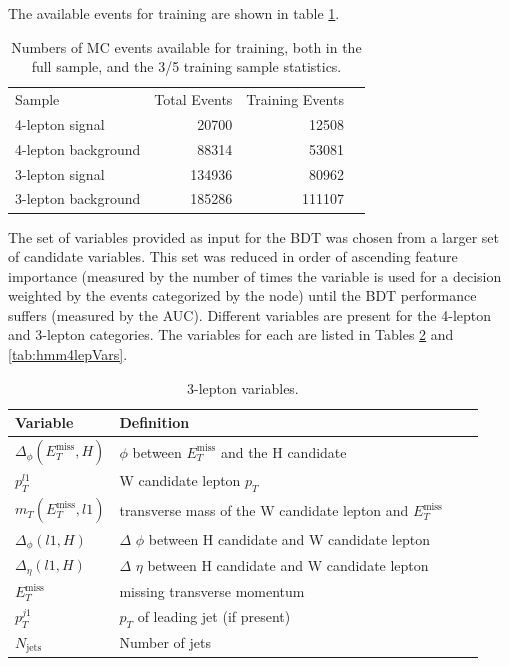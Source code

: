 The available events for training are shown in table \ref{tab:hmmSampleStatistics}.

\begin{table}[htbp]
 \begin{center}
\begin{tabular}{l r r r}\toprule
Sample               & Total Events & Training Events \\
4-lepton signal      & 20700        & 12508    \\
4-lepton background  & 88314        & 53081    \\
3-lepton signal      & 134936       & 80962    \\
3-lepton background  & 185286       & 111107   \\
\bottomrule\end{tabular} 
 \end{center}
 \caption{Numbers of MC events available for training, both in the full sample, and the 3/5 training sample statistics.}
\label{tab:hmmSampleStatistics}
\end{table}

The set of variables provided as input for the BDT was chosen from a larger set of candidate variables.
This set was reduced in order of ascending feature importance (measured by the number of times the variable is used for a decision weighted by the events categorized by the node) until the BDT performance suffers (measured by the AUC).
Different variables are present for the 4-lepton and 3-lepton categories.
The variables for each are listed in Tables \ref{tab:hmm3lepVars} and \ref{tab:hmm4lepVars}.

\begin{table}[htp]
\begin{center}
\begin{tabular}{l l l l}
\toprule
Variable & Definition \\
\midrule
 $\Delta_\phi(E_T^\text{miss},H)$ & $\phi$ between $E_T^\text{miss}$ and the H candidate \\
 $p_T^{l1}$ & W candidate lepton $p_T$ \\
 $m_T(E_T^\text{miss},l1)$ & transverse mass of the W candidate lepton and $E_T^\text{miss}$  \\
 $\Delta_\phi(l1,H)$ & $\Delta$ $\phi$ between H candidate and W candidate lepton \\
 $\Delta_\eta(l1,H)$ & $\Delta$ $\eta$ between H candidate and W candidate lepton \\
 $E_T^\text{miss}$ & missing transverse momentum \\
 $p_T^{j1}$ & $p_T$ of leading jet (if present) \\
 $N_\text{jets}$ & Number of jets \\
\bottomrule
\end{tabular}
\caption{3-lepton variables.}
\label{tab:hmm3lepVars}
\end{center}
\end{table}

